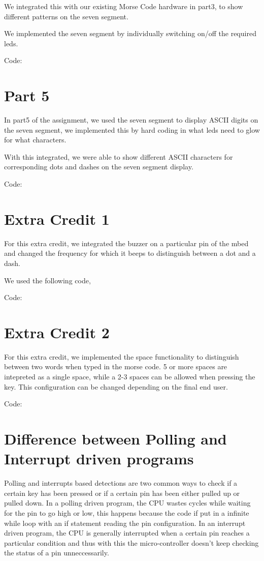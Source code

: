 \documentclass[a4paper]{article}
\begin{document}
We integrated this with our existing Morse Code hardware in part3, to show different patterns on the seven segment. 

We implemented the seven segment by individually switching on/off the required leds. 

Code:



\section*{Part 5}
In part5 of the assignment, we used the seven segment to display ASCII digits on the seven segment, we implemented this by hard coding in what leds need to glow for what characters.

With this integrated, we were able to show different ASCII characters for corresponding dots and dashes on the seven segment display. 

Code:


\section*{Extra Credit 1}
For this extra credit, we integrated the buzzer on a particular pin of the mbed and changed the frequency for which it beeps to distinguish between a dot and a dash. 

We used the following code, 

Code:


\section*{Extra Credit 2}
For this extra credit, we implemented the space functionality to distinguish between two words when typed in the morse code. 5 or more spaces are intepreted as a single space, while a 2-3 spaces can be allowed when pressing the key. This configuration can be changed depending on the final end user. 

Code: 


\section*{Difference between Polling and Interrupt driven programs}
Polling and interrupts based detections are two common ways to check if 
a certain key has been pressed or if a certain pin has been either 
pulled up or pulled down. In a polling driven program, the CPU wastes 
cycles while waiting for the pin to go high or low, this happens 
because the code if put in a infinite while loop with an if statement 
reading the pin configuration. In an interrupt driven program, the CPU 
is generally interrupted when a certain pin reaches a particular 
condition and thus with this the micro-controller doesn't keep 
checking the status of a pin unneccessarily.
\end{document}
